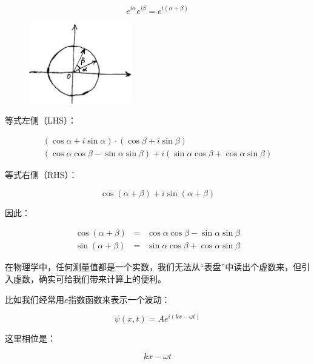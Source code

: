 \begin{equation*}
e^{i \alpha} e^{i \beta} = e^{i (\alpha + \beta)}  
\end{equation*}

\begin{figure}[htbp]
\begin{center}
\includegraphics[width=4.5cm]{Preface/alphaplusbeta.png}
\end{center}
\end{figure}


等式左侧（LHS）：

\begin{eqnarray*}
(\cos \alpha + i \sin \alpha) \cdot (\cos \beta + i \sin \beta)  \\
 (\cos \alpha \cos \beta - \sin \alpha \sin \beta ) + i ( \sin \alpha \cos \beta + \cos \alpha \sin \beta)
\end{eqnarray*}

等式右侧（RHS）：

\begin{equation}
\cos (\alpha + \beta) + i \sin (\alpha + \beta)
\end{equation}

因此：

\begin{eqnarray}
\cos (\alpha + \beta) &=& \cos \alpha \cos \beta - \sin \alpha \sin \beta\\
\sin (\alpha + \beta)&=& \sin \alpha \cos \beta + \cos \alpha \sin \beta
\end{eqnarray}

在物理学中，任何测量值都是一个实数，我们无法从“表盘”中读出个虚数来，但引入虚数，确实可给我们带来计算上的便利。

比如我们经常用$e$指数函数来表示一个波动：

\begin{equation}
\psi (x,t) = A e^{i (kx - \omega t)}
\end{equation}

这里相位是：

\begin{equation*}
k x - \omega t
\end{equation*}

